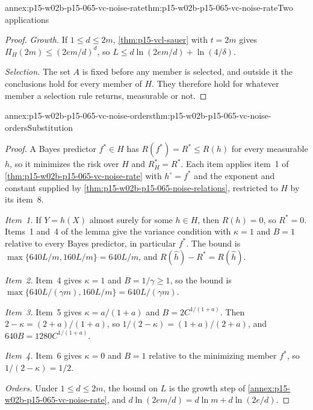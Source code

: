 \begin{annexitem}{annex:p15-w02b-p15-065-vc-noise-rate}{thm:p15-w02b-p15-065-vc-noise-rate}{Two applications}
\begin{proof}
\emph{Growth.} If \(1\leq d\leq2m\), \cref{thm:p15-vcl-sauer} with
\(t=2m\) gives \(\Pi_H(2m)\leq(2em/d)^d\), so
\(L\leq d\ln(2em/d)+\ln(4/\delta)\).

\emph{Selection.} The set \(A\) is fixed before any member is selected,
and outside it the conclusions hold for every member of \(H\). They
therefore hold for whatever member a selection rule returns, measurable or
not.
\end{proof}
\end{annexitem}

\begin{annexitem}{annex:p15-w02b-p15-065-vc-noise-orders}{thm:p15-w02b-p15-065-vc-noise-orders}{Substitution}
\begin{proof}
A Bayes predictor \(f^{*}\in H\) has \(R(f^{*})=R^{*}\leq R(h)\) for every
measurable \(h\), so it minimizes the risk over \(H\) and
\(R_H^{*}=R^{*}\). Each item applies item~1 of
\cref{thm:p15-w02b-p15-065-vc-noise-rate} with \(h^{\circ}=f^{*}\) and the
exponent and constant supplied by
\cref{thm:p15-w02b-p15-065-noise-relations}, restricted to \(H\) by its
item~8.

\emph{Item~1.} If \(Y=h(X)\) almost surely for some \(h\in H\), then
\(R(h)=0\), so \(R^{*}=0\). Items~1 and~4 of the lemma give the variance
condition with \(\kappa=1\) and \(B=1\) relative to every Bayes predictor,
in particular \(f^{*}\). The bound is
\(\max\{640L/m,160L/m\}=640L/m\), and \(R(\widehat h)-R^{*}=R(\widehat h)\).

\emph{Item~2.} Item~4 gives \(\kappa=1\) and \(B=1/\gamma\geq1\), so the
bound is \(\max\{640L/(\gamma m),160L/m\}=640L/(\gamma m)\).

\emph{Item~3.} Item~5 gives \(\kappa=a/(1+a)\) and
\(B=2C^{1/(1+a)}\). Then \(2-\kappa=(2+a)/(1+a)\), so
\(1/(2-\kappa)=(1+a)/(2+a)\), and \(640B=1280C^{1/(1+a)}\).

\emph{Item~4.} Item~6 gives \(\kappa=0\) and \(B=1\) relative to the
minimizing member \(f^{*}\), so \(1/(2-\kappa)=1/2\).

\emph{Orders.} Under \(1\leq d\leq2m\), the bound on \(L\) is the
growth step of \cref{annex:p15-w02b-p15-065-vc-noise-rate}, and
\(d\ln(2em/d)=d\ln m+d\ln(2e/d)\).
\end{proof}
\end{annexitem}


